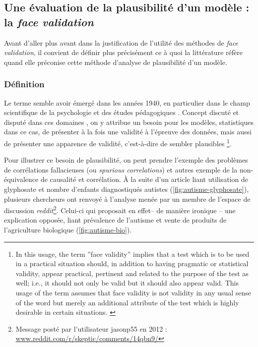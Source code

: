 \subsection{Une évaluation de la plausibilité d'un modèle : la \og \textit{face validation}\fg{}}\label{subsec:face-validity}

Avant d'aller plus avant dans la justification de l'utilité des méthodes de \textit{face validation}, il convient de définir plus précisément ce à quoi la littérature réfère quand elle préconise cette méthode d'analyse de plausibilité d'un modèle.

\subsubsection{Définition}
Le terme semble avoir émergé dans les années 1940, en particulier dans le champ scientifique de la psychologie et des études pédagogiques \autocite{nevo_face_1985}.
Concept discuté et disputé dans ces domaines \autocite{mosier_critical_1947}, on y attribue un besoin pour les modèles, statistiques dans ce cas, de présenter à la fois une validité à l'épreuve des données, mais aussi de présenter une apparence de validité, c'est-à-dire de sembler plausibles
\footnote{
	\og In this usage, the term ''face validity'' implies that a test which is to be used in a practical situation should, in addition to having pragmatic or statistical validity, appear practical, pertinent and related to the purpose of the test as well; i.e., it should not only be valid but it should also appear valid. This usage of the term assumes that \og face validity\fg{} is not validity in any usual sense of the word but merely an additional attribute of the test which is highly desirable in certain situations.\fg{} \textcite[192]{mosier_critical_1947}
}.

Pour illustrer ce besoin de \og plausibilité\fg{}, on peut prendre l'exemple des problèmes de corrélations fallacieuses (ou \og \textit{spurious correlations}\fg{}) et autres exemple de la non-équivalence de causalité et corrélation.
À la suite d'un article \autocite{shaw_elevated_2017} liant utilisation de glyphosate et nombre d'enfants diagnostiqués autistes (\cref{fig:autisme-glyphosate}), plusieurs chercheurs ont renvoyé à l'analyse menée par un membre de l'espace de discussion \textit{reddit}\footnote{
Message posté par l'utilisateur \og jasonp55\fg{} en 2012 : \\ \href{https://www.reddit.com/r/skeptic/comments/14qbn9/rskeptic_i_was_practicing_graphpad_and_i_think_i/}{www.reddit.com/r/skeptic/comments/14qbn9/}
}.
Celui-ci qui proposait en effet-- de manière ironique -- une explication opposée, liant prévalence de l'autisme et vente de produits de  l'agriculture biologique (\cref{fig:autisme-bio}).

